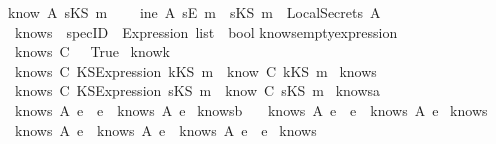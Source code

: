\begin{isabellebody}
\ {\isachardoublequoteopen}know\ A\ {\isacharparenleft}sKS\ m{\isacharparenright}\ {\isacharequal}\ \isanewline
\ \ {\isacharparenleft}{\isacharparenleft}ine\ A\ {\isacharparenleft}sE\ m{\isacharparenright}{\isacharparenright}\ {\isasymor}\ {\isacharparenleft}{\isacharparenleft}sKS\ m{\isacharparenright}\ {\isasymin}\ {\isacharparenleft}LocalSecrets\ A{\isacharparenright}{\isacharparenright}{\isacharparenright}{\isachardoublequoteclose}\isanewline
\isanewline
{}\isamarkupfalse%
\isanewline
\ \ knows\ {\isacharcolon}{\isacharcolon}\ {\isachardoublequoteopen}specID\ {\isasymRightarrow}\ Expression\ list\ {\isasymRightarrow}\ bool{\isachardoublequoteclose}\isanewline
{}\isanewline
knows{\isacharunderscore}emptyexpression{\isacharcolon}\isanewline
\ \ {\isachardoublequoteopen}knows\ C\ {\isacharbrackleft}{\isacharbrackright}\ {\isacharequal}\ True{\isachardoublequoteclose}\ \isanewline
know{}k{\isacharcolon}\ \isanewline
\ \ {\isachardoublequoteopen}knows\ C\ {\isacharbrackleft}KS{}Expression\ {\isacharparenleft}kKS\ m{}{\isacharparenright}{\isacharbrackright}\ {\isacharequal}\ know\ C\ {\isacharparenleft}kKS\ m{}{\isacharparenright}{\isachardoublequoteclose}\ \isanewline
know{}s{\isacharcolon}\isanewline
\ \ {\isachardoublequoteopen}knows\ C\ {\isacharbrackleft}KS{}Expression\ {\isacharparenleft}sKS\ m{}{\isacharparenright}{\isacharbrackright}\ {\isacharequal}\ know\ C\ {\isacharparenleft}sKS\ m{}{\isacharparenright}{\isachardoublequoteclose}\ \isanewline
knows{}a{\isacharcolon}\ \isanewline
\ \ {\isachardoublequoteopen}knows\ A\ {\isacharparenleft}e{}\ {\isacharat}\ e{\isacharparenright}\ {\isasymlongrightarrow}\ knows\ A\ e{\isachardoublequoteclose}\ \isanewline
knows{}b{\isacharcolon}\ \isanewline
\ \ {\isachardoublequoteopen}knows\ A\ {\isacharparenleft}e\ {\isacharat}\ e{}{\isacharparenright}\ {\isasymlongrightarrow}\ knows\ A\ e{\isachardoublequoteclose}\ \isanewline
knows{}{\isacharcolon}\ \isanewline
\ \ {\isachardoublequoteopen}{\isacharparenleft}knows\ A\ e{}{\isacharparenright}\ {\isasymand}\ {\isacharparenleft}knows\ A\ e{}{\isacharparenright}\ {\isasymlongrightarrow}\ knows\ A\ {\isacharparenleft}e{}\ {\isacharat}\ e{}{\isacharparenright}{\isachardoublequoteclose}\ \isanewline
knows{}{\isacharcolon}\ \isanewline

\end{isabellebody}
